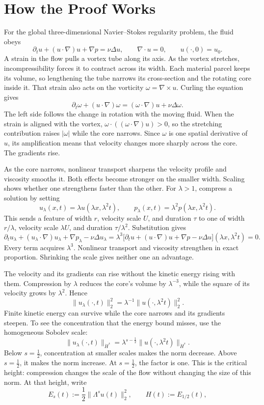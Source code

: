 \documentclass[11pt]{article}
\begin{document}
\section*{How the Proof Works}

For the global three-dimensional Navier--Stokes regularity problem, the fluid obeys
\[
\partial_tu+(u\cdot\nabla)u+\nabla p=\nu\Delta u,
\qquad \nabla\cdot u=0,
\qquad u(\cdot,0)=u_0.
\]
A strain in the flow pulls a vortex tube along its axis. As the vortex stretches, incompressibility forces it to contract across its width. Each material parcel keeps its volume, so lengthening the tube narrows its cross-section and the rotating core inside it. That strain also acts on the vorticity \(\omega=\nabla\times u\). Curling the equation gives
\[
\partial_t\omega+(u\cdot\nabla)\omega
=(\omega\cdot\nabla)u+\nu\Delta\omega.
\]
The left side follows the change in rotation with the moving fluid. When the strain is aligned with the vortex, \(\omega\cdot((\omega\cdot\nabla)u)>0\), so the stretching contribution raises \(|\omega|\) while the core narrows. Since \(\omega\) is one spatial derivative of \(u\), its amplification means that velocity changes more sharply across the core. The gradients rise.

As the core narrows, nonlinear transport sharpens the velocity profile and viscosity smooths it. Both effects become stronger on the smaller width. Scaling shows whether one strengthens faster than the other. For \(\lambda>1\), compress a solution by setting
\[
u_\lambda(x,t)=\lambda u(\lambda x,\lambda^2t),
\qquad
p_\lambda(x,t)=\lambda^2p(\lambda x,\lambda^2t).
\]
This sends a feature of width \(r\), velocity scale \(U\), and duration \(\tau\) to one of width \(r/\lambda\), velocity scale \(\lambda U\), and duration \(\tau/\lambda^2\). Substitution gives
\[
\partial_tu_\lambda+(u_\lambda\cdot\nabla)u_\lambda
+\nabla p_\lambda-\nu\Delta u_\lambda
=\lambda^3
\bigl[\partial_tu+(u\cdot\nabla)u+\nabla p-\nu\Delta u\bigr]
(\lambda x,\lambda^2t)=0.
\]
Every term acquires \(\lambda^3\). Nonlinear transport and viscosity strengthen in exact proportion. Shrinking the scale gives neither one an advantage.

The velocity and its gradients can rise without the kinetic energy rising with them. Compression by \(\lambda\) reduces the core's volume by \(\lambda^{-3}\), while the square of its velocity grows by \(\lambda^2\). Hence
\[
\|u_\lambda(\cdot,t)\|_2^2
=\lambda^{-1}\|u(\cdot,\lambda^2t)\|_2^2.
\]
Finite kinetic energy can survive while the core narrows and its gradients steepen. To see the concentration that the energy bound misses, use the homogeneous Sobolev scale:
\[
\|u_\lambda(\cdot,t)\|_{\dot H^s}
=\lambda^{s-\frac12}
\|u(\cdot,\lambda^2t)\|_{\dot H^s}.
\]
Below \(s=\tfrac12\), concentration at smaller scales makes the norm decrease. Above \(s=\tfrac12\), it makes the norm increase. At \(s=\tfrac12\), the factor is one. This is the critical height: compression changes the scale of the flow without changing the size of this norm. At that height, write
\[
E_s(t):=\frac12\|\Lambda^su(t)\|_2^2,
\qquad
H(t):=E_{1/2}(t),
\]
\end{document}
